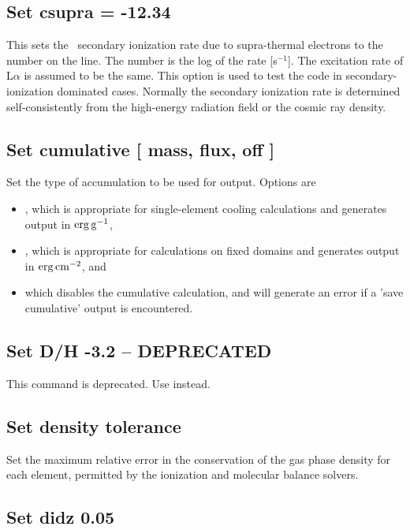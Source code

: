 \subsection{Set csupra = -12.34}

This sets the \hO\ secondary ionization rate due to supra-thermal electrons
to the number on the line.
The number is the log of the rate [s$^{-1}$].
The
excitation rate of L$\alpha $ is assumed to be the same.
This option is used to
test the code in secondary-ionization dominated cases.
Normally the
secondary ionization rate is determined self-consistently from the
high-energy radiation field or the cosmic ray density.

\subsection{Set cumulative [ mass, flux, off ]}
\label{sec:SetCumulativeCommand}

Set the type of accumulation to be used for  output.  Options are 
\begin{itemize}
\item {}, which is
appropriate for single-element cooling calculations and generates
output in $\rm erg\,g^{-1}$, 
\item {}, which is
appropriate for calculations on fixed domains and generates
output in $\rm erg\,cm^{-2}$, and
\item {} which disables the cumulative calculation, and
will generate an error if a 'save cumulative' output is encountered.
\end{itemize}

\subsection{Set D/H -3.2 -- DEPRECATED}

This command is deprecated.
Use  instead.

\subsection{Set density tolerance}

Set the maximum relative error in the conservation of
the gas phase density for each element, permitted
by the ionization and molecular balance solvers.

\subsection{Set didz 0.05 }

